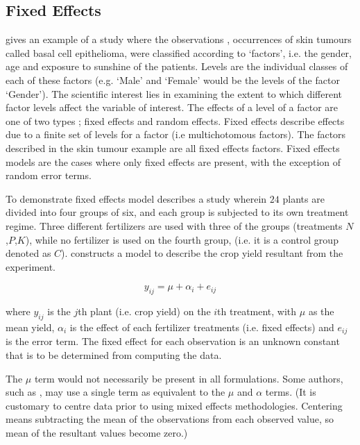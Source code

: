 \documentclass[12pt, a4paper]{report}
\theoremstyle{plain}
\theoremstyle{definition}
\theoremstyle{remark}
\begin{document}
\subsection{Fixed Effects}
\citet{McCullSearle} gives an example of a study where the
observations , occurrences of skin tumours called basal cell
epithelioma, were classified according to `factors', i.e. the
gender, age and exposure to sunshine of the patients. Levels are
the individual classes of each of these factors (e.g. `Male' and
`Female' would be the levels of the factor `Gender'). The
scientific interest lies in examining the extent to which
different factor levels affect the variable of interest. The
effects of a level of a factor are one of two types ; fixed
effects and random effects. Fixed effects describe effects due to
a finite set of levels for a factor (i.e multichotomous factors).
The factors described in the skin tumour example are all fixed
effects factors. Fixed effects models are the cases where only
fixed effects are present, with the exception of random error
terms.

To demonstrate fixed effects model \citet{Searle} describes a
study wherein $24$ plants are divided into four groups of six, and
each group is subjected to its own treatment regime. Three
different fertilizers are used with three of the groups
(treatments $N$,$P$,$K$), while no fertilizer is used on the
fourth group, (i.e. it is a control group denoted as $C$).
\citet{Searle} constructs a model to describe the crop yield
resultant from the experiment.

\begin{equation}
y_{ij} = \mu + \alpha_{i} + e_{ij}
\end{equation}

where $y_{ij}$ is the $j$th plant (i.e. crop yield) on the $i$th
treatment, with $\mu$ as the mean yield, $\alpha_{i}$ is the
effect of each fertilizer treatments (i.e. fixed effects) and
$e_{ij}$ is the error term. The fixed effect for each observation
is an unknown constant that is to be determined from computing the
data.

The $\mu$ term would not
necessarily be present in all formulations. Some authors, such as
\citet{Demi}, may use a single term as equivalent to the $\mu$ and
$\alpha$ terms. (It is customary to centre data prior to using
mixed effects methodologies. Centering means subtracting the mean
of the observations from each observed value, so mean of the
resultant values become zero.)
\end{document}
